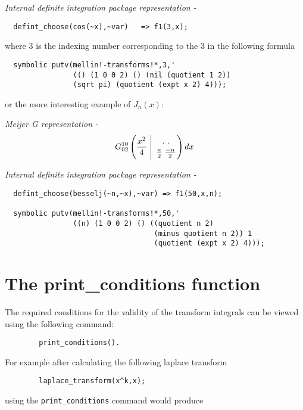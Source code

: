 \it Internal definite integration package representation  - 
\begin{verbatim}
  defint_choose(cos(~x),~var)   => f1(3,x);
\end{verbatim}

\rm where 3 is the indexing number corresponding to the 3
in the following formula

\begin{verbatim}
  symbolic putv(mellin!-transforms!*,3,'
                (() (1 0 0 2) () (nil (quotient 1 2))
                (sqrt pi) (quotient (expt x 2) 4)));
\end{verbatim} 

or the more interesting example of $J_{n}(x)$:

\it Meijer G representation  -  
\begin{displaymath}
G^{1 0}_{0 2} \left(\frac{x^{2}}{4} \ \Bigg\vert 
\ {. \; .  \atop \frac{n}{2} \; {\frac{-n}{2}}} \right) dx 
\end{displaymath}

\it Internal definite integration package representation  - 

\begin{verbatim}
  defint_choose(besselj(~n,~x),~var) => f1(50,x,n);

  symbolic putv(mellin!-transforms!*,50,'
                ((n) (1 0 0 2) () ((quotient n 2)
                                   (minus quotient n 2)) 1
                                   (quotient (expt x 2) 4)));
\end{verbatim} 

\section{The print\_conditions function}

\rm The required conditions for the validity of the transform integrals
can be viewed using the following command:

\begin{verbatim}
        print_conditions().
\end{verbatim}

For example after calculating the following laplace transform

\begin{verbatim}
        laplace_transform(x^k,x);
\end{verbatim}

using the \verb+print_conditions+ command would produce


